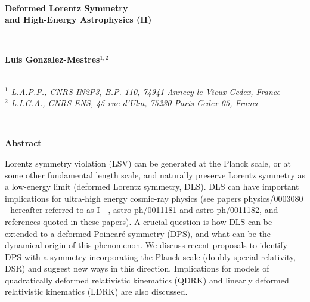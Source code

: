 \documentclass[a4paper,12pt,dvips]{article}
\begin{document}
%
\makeatletter{}
\makeatother\thispagestyle{icrc}
%
%

\begin{center}
%
~ 

{\LARGE \bf Deformed Lorentz Symmetry\\ 
and High-Energy Astrophysics (II)}
\end{center}

\begin{center}
%
%
~ 

{\bf Luis Gonzalez-Mestres$^{1,2}$}\\

~ 

{\it $^{1}$ L.A.P.P., CNRS-IN2P3, B.P. 110, 74941 Annecy-le-Vieux Cedex, France \\
$^{2}$ L.I.G.A., CNRS-ENS, 45 rue d'Ulm, 75230 Paris Cedex 05, France }
\end{center}

~ 

\begin{center}
{\large \bf Abstract\\}
\end{center}
\vspace{-0.5ex}
%
%
Lorentz symmetry violation (LSV) 
can be generated at the Planck scale, or at some
other fundamental length scale, and
naturally preserve Lorentz symmetry
as a low-energy limit (deformed Lorentz symmetry, DLS). 
DLS can
have important implications for ultra-high energy cosmic-ray physics
(see papers physics/0003080 - hereafter referred to as I - , astro-ph/0011181 and astro-ph/0011182, and references quoted in these papers). A crucial
question is how DLS can be extended to a deformed Poincar\'e symmetry (DPS), and what can be the dynamical origin of this phenomenon. We
discuss recent proposals to identify DPS with a symmetry incorporating the Planck scale (doubly special relativity, DSR) and suggest new ways in this direction. Implications for models of quadratically deformed relativistic kinematics (QDRK) and linearly deformed relativistic kinematics (LDRK) are also discussed.
\end{document}
